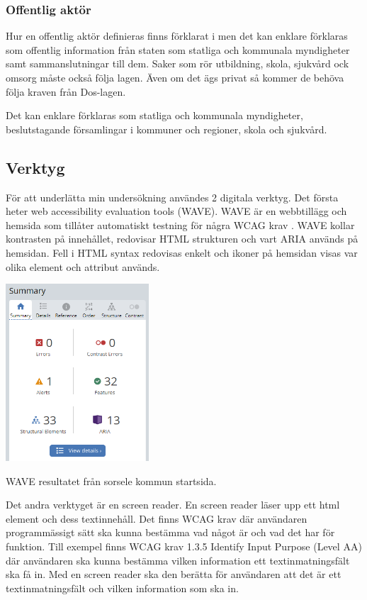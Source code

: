 \documentclass[11p]{article}
\begin{document}
    \subsubsection{Offentlig aktör}
    Hur en offentlig aktör definieras finns förklarat i \textcite{Dos-lagen} men det kan enklare förklaras som offentlig information från staten som statliga och kommunala myndigheter samt sammanslutningar till dem.
    Saker som rör utbildning, skola, sjukvård ock omsorg måste också följa lagen.
    Även om det ägs privat så kommer de behöva följa kraven från Dos-lagen.

    Det kan enklare förklaras som statliga och kommunala myndigheter, beslutstagande församlingar i kommuner och regioner, skola och sjukvård.\parencite{Om_Dos-lage}


    \subsection{Verktyg}
    För att underlätta min undersökning användes 2 digitala verktyg.
    Det första heter web accessibility evaluation tools (WAVE).
    WAVE är en webbtillägg och hemsida som tillåter automatiskt testning för några WCAG krav \parencite{WAVE}.
    WAVE kollar kontrasten på innehållet, redovisar HTML strukturen och vart ARIA används på hemsidan.
    Fell i HTML syntax redovisas enkelt och ikoner på hemsidan visas var olika element och attribut används.

    \includegraphics[width=0.4\textwidth]{../images/WAVE.png}

    WAVE resultatet från sorsele kommun startsida.

    Det andra verktyget är en screen reader.
    En screen reader läser upp ett html element och dess textinnehåll.
    Det finns WCAG krav där användaren programmässigt sätt ska kunna bestämma vad något är och vad det har för funktion.
    Till exempel finns WCAG krav 1.3.5 Identify Input Purpose (Level AA) där användaren ska kunna bestämma vilken information ett textinmatningsfält ska få in.
    Med en screen reader ska den berätta för användaren att det är ett textinmatningsfält och vilken information som ska in.
\end{document}
